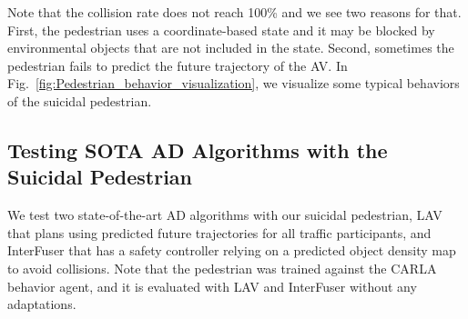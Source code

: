 \documentclass[letterpaper, 10 pt, conference]{ieeeconf}
\begin{document}
Note that the collision rate does not reach 100\% and we see two reasons for that.
First, the pedestrian uses a coordinate-based state and it may be blocked by environmental objects that are not included in the state.
Second, sometimes the pedestrian fails to predict the future trajectory of the AV.
In Fig.~\ref{fig:Pedestrian_behavior_visualization}, we visualize some typical behaviors of the suicidal pedestrian. 





\subsection{Testing SOTA AD Algorithms with the Suicidal Pedestrian} %

We test two state-of-the-art AD algorithms with our suicidal pedestrian, LAV \cite{chen2022learningfromallvehicles} that plans using predicted future trajectories for all traffic participants, and InterFuser \cite{shao2023safetysafetyenhanced} that has a safety controller relying on a predicted object density map to avoid collisions.
Note that the pedestrian was trained against the CARLA behavior agent, and it is evaluated with LAV and InterFuser without any adaptations.
\end{document}
